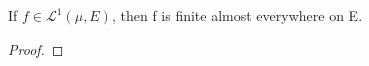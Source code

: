 \documentclass[11pt]{scrartcl}
\begin{document}
\begin{exercise}
If $f\in \mathscr{L}^1(\mu,E)$, then f is finite almost everywhere on E.
\end{exercise}

\begin{definition}

\end{definition}
\begin{exercise}

\end{exercise}
\begin{theorem}

\end{theorem}
\begin{lemma}

\end{lemma}
\begin{proof}

\end{proof}

\begin{definition}

\end{definition}
\begin{remark}

\end{remark}



\end{document}
